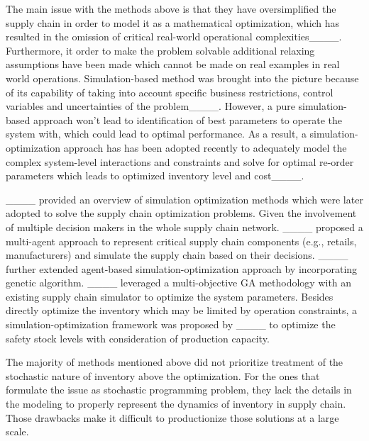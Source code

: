 The main issue with the methods above is that they have oversimplified the supply chain in order to model it as a mathematical optimization, which has resulted in the omission of critical real-world operational complexities____. Furthermore, it order to make the problem solvable additional relaxing assumptions have been made which cannot be made on real examples in real world operations. Simulation-based method was brought into the picture because of its capability of taking into account specific business restrictions, control variables and uncertainties of the problem____. However, a pure simulation-based approach won't lead to identification of best parameters to operate the system with, which could lead to optimal performance. As a result, a simulation-optimization approach has has been adopted recently to adequately model the complex system-level interactions and constraints and solve for optimal re-order parameters which leads to optimized inventory level and cost____.


____ provided an overview of simulation optimization methods which were later adopted to solve the supply chain optimization problems. Given the involvement of multiple decision makers in the whole supply chain network. ____ proposed a multi-agent approach to represent critical supply chain components (e.g., retails, manufacturers) and simulate the supply chain based on their decisions. ____ further extended agent-based  simulation-optimization approach by incorporating genetic algorithm. ____ leveraged a multi-objective GA methodology with an existing supply chain simulator to optimize the system parameters. Besides directly optimize the inventory which may be limited by operation constraints, a simulation-optimization framework was proposed by ____ to optimize the safety stock levels with consideration of production capacity.

The majority of methods mentioned above did not prioritize treatment of the stochastic nature of inventory above the optimization. For the ones that formulate the issue as stochastic programming problem, they lack the details in the modeling to properly represent the dynamics of inventory in supply chain. Those drawbacks make it difficult to productionize those solutions at a large scale.